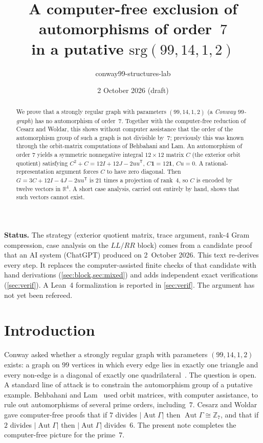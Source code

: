 \documentclass[11pt,a4paper]{amsart}
\title{A computer-free exclusion of automorphisms of order~$7$\\ in a putative $\mathrm{srg}(99,14,1,2)$}
\author{conway99-structures-lab}
\date{2 October 2026 (draft)}
\theoremstyle{definition}
\theoremstyle{remark}
\newcommand{\Z}{\mathbb{Z}}
\newcommand{\R}{\mathbb{R}}
\newcommand{\one}{\mathbf{1}}
\DeclareMathOperator{\Aut}{Aut}
\begin{document}
\begin{abstract}
We prove that a strongly regular graph with parameters $(99,14,1,2)$ (a \emph{Conway $99$-graph})
has no automorphism of order~$7$. Together with the computer-free reduction of Cesarz and Woldar,
this shows without computer assistance that the order of the automorphism group of such a graph is not
divisible by~$7$; previously this was known through the orbit-matrix computations of Behbahani and Lam.
An automorphism of order $7$ yields a symmetric nonnegative integral $12\times12$ matrix $C$
(the exterior orbit quotient) satisfying $C^2+C=12I+12J-2uu^{\mathsf T}$, $C\one=12\one$, $Cu=0$.
A rational-representation argument forces $C$ to have zero diagonal. Then $G=3C+12I-4J-2uu^{\mathsf T}$
is $21$ times a projection of rank~$4$, so $C$ is encoded by twelve vectors in $\R^4$. A short case
analysis, carried out entirely by hand, shows that such vectors cannot exist.
\end{abstract}

\maketitle

\noindent\textbf{Status.} The strategy (exterior quotient matrix, trace argument, rank-$4$ Gram compression,
case analysis on the $LL/RR$ block) comes from a candidate proof that an AI system (ChatGPT) produced on
2~October 2026. This text re-derives every step. It replaces the computer-assisted finite checks of that
candidate with hand derivations (\cref{sec:block,sec:mixed}) and adds independent exact verifications
(\cref{sec:verif}). A Lean~4 formalization is reported in \cref{sec:verif}.
The argument has not yet been refereed.

\section{Introduction}

Conway asked whether a strongly regular graph with parameters $(99,14,1,2)$ exists: a graph on $99$
vertices in which every edge lies in exactly one triangle and every non-edge is a diagonal of exactly one
quadrilateral~\cite{Conway}. The question is open. A standard line of attack is to constrain the
automorphism group of a putative example. Behbahani and Lam~\cite{BL} used orbit matrices, with
computer assistance, to rule out automorphisms of several prime orders, including~$7$. Cesarz and
Woldar~\cite{CW} gave computer-free proofs that if $7$ divides $|\Aut\Gamma|$ then $\Aut\Gamma\cong\Z_7$,
and that if $2$ divides $|\Aut\Gamma|$ then $|\Aut\Gamma|$ divides~$6$. The present note completes the
computer-free picture for the prime~$7$.
\end{document}
